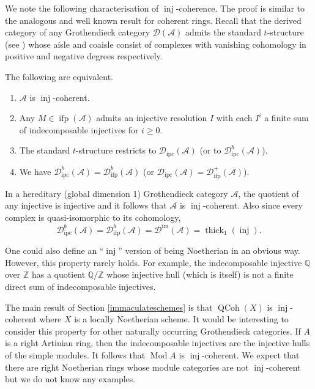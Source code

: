 \documentclass[12pt,oneside]{amsart}
\DeclareMathOperator{\thick}{thick}
\DeclareMathOperator{\Mod}{Mod}
\DeclareMathOperator{\QCoh}{QCoh}
\DeclareMathOperator{\inj}{inj}
\DeclareMathOperator{\immac}{im}
\DeclareMathOperator{\ipscoh}{ipc}
\DeclareMathOperator{\ifp}{ifp}
\begin{document}
We note the following characterisation of $\inj$-coherence. The proof is similar to the analogous and well known result for coherent rings. 
Recall that the derived category of any Grothendieck category $\mathcal{D}(\mathcal{A})$ admits the standard $t$-structure (see \cite{BBD82}) whose aisle and coaisle consist of complexes with vanishing cohomology in positive and negative degrees respectively.

\begin{prop} \label{injcohequiv}
The following are equivalent.
\begin{enumerate}
\item $\mathcal{A}$ is $\inj$-coherent.
\item Any $M \in \ifp(\mathcal{A})$ admits an injective resolution $I$ with each $I^i$ a finite sum of indecomposable injectives for $i \geq 0$.

\item The standard $t$-structure restricts to $\mathcal{D}_{\ipscoh}(\mathcal{A})$ (or to $\mathcal{D}^b_{\ipscoh}(\mathcal{A})$).  


\item We have $\mathcal{D}^b_{\ipscoh}(\mathcal{A}) = \mathcal{D}^b_{\ifp}(\mathcal{A})$ (or $\mathcal{D}_{\ipscoh}(\mathcal{A}) = \mathcal{D}_{\ifp}^+(\mathcal{A})$).
 
\end{enumerate}
\end{prop}


\begin{remark} 
In a hereditary (global dimension 1) Grothendieck category $\mathcal{A}$, the quotient of any injective is injective and it follows that $\mathcal{A}$ is $\inj$-coherent. Also since every complex is quasi-isomorphic to its cohomology, 
\[
\mathcal{D}^b_{\ipscoh}(\mathcal{A}) = \mathcal{D}^b_{\ifp}(\mathcal{A}) = \mathcal{D}^{\immac}(\mathcal{A}) = \thick_1(\inj).
\]
\end{remark}


\begin{remark}
One could also define an ``$\inj$'' version of being Noetherian in an obvious way. However, this property rarely holds. For example, the indecomposable injective $\mathbb{Q}$ over $\mathbb{Z}$ has a quotient $\mathbb{Q}/\mathbb{Z}$ whose injective hull (which is itself) is not a finite direct sum of indecomposable injectives. 
\end{remark}

\begin{remark}
The main result of Section \ref{immaculateschemes} is that $\QCoh(X)$ is $\inj$-coherent where $X$ is a locally Noetherian scheme. It would be interesting to consider this property for other naturally occurring Grothendieck categories. If $A$ is a right Artinian ring, then the indecomposable injectives are the injective hulls of the simple modules. It follows that $\Mod A$ is $\inj$-coherent. We expect that there are right Noetherian rings whose module categories are not $\inj$-coherent but we do not know any examples. 
\end{remark}
\end{document}
